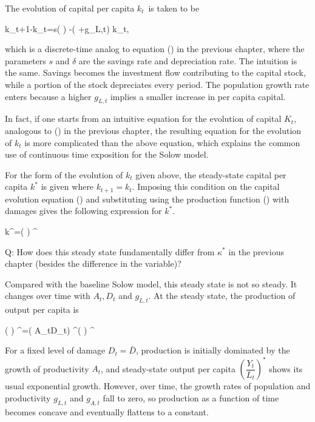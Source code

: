 ﻿\documentclass[oneside]{book}
\begin{document}
The evolution of capital per capita $k_{t}$\ is taken to be



k_{t+1}-k_{t}=s( ) -( \delta
+g_{L,t}) k_{t},


which is a discrete-time analog to equation () in the previous
chapter, where the parameters $s$ and $\delta $ are the savings rate and
depreciation rate. The intuition is the same. Savings becomes the
investment flow contributing to the capital stock, while a portion of the
stock depreciates every period. The population growth rate enters because a
higher $g_{L,t}$ implies a smaller increase in per capita capital.

In fact, if one starts from an intuitive equation for the evolution of
capital $K_{t}$, analogous to () in the previous chapter, the
resulting equation for the evolution of $k_{t}$ is more complicated than
the above equation, which explains the common use of continuous time exposition
for the Solow model.

For the form of the evolution of $k_{t}$ given above, the steady-state
capital per capita $k^{\ast }$ is given where $k_{t+1}=k_{t}$. Imposing
this condition on the capital evolution equation () and
substituting using the production function () with damages
gives the following expression for $k^{\ast }$.



k^{\ast }=( ) ^{}


Q: How does this steady state fundamentally differ from $\kappa ^{\ast }$
in the previous chapter (besides the difference in the variable)?

Compared with the baseline Solow model, this steady state is not so steady. It changes over time with $A_{t},D_{t}$ and $g_{L,t}$. At the steady state, the production of output per capita is



( ) ^{\ast }=( A_{t}D_{t}) ^{}( ) ^{}


For a fixed level of damage $D_{t}=\bar{D}$, production is initially
dominated by the growth of productivity $A_{t}$, and steady-state output per
capita $( \dfrac{Y_{t}}{L_{t}}) ^{\ast }$ shows its usual
exponential growth. However, over time, the growth rates of population and
productivity $g_{L,t}$ and $g_{A,t}$ fall to zero, so production as a
function of time becomes concave and eventually flattens to a constant.
\end{document}
